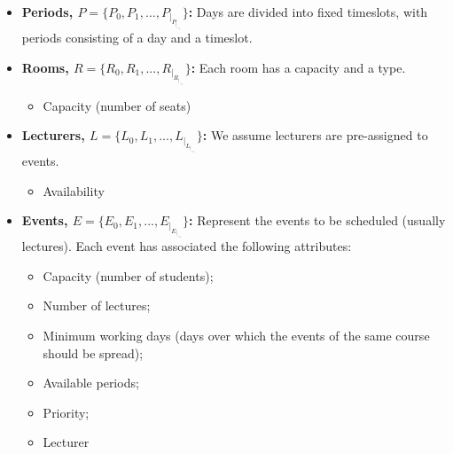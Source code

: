 \begin{itemize}
	\item \textbf{Periods, \(P = \{P_0, P_1, ..., P_|_P_|_-_1\}\):} Days are divided into fixed timeslots, with periods consisting of a day and a timeslot.


	\item \textbf{Rooms, \(R = \{R_0, R_1, ..., R_|_R_|_-_1\}\):} Each room has a capacity and a type.
		\begin{itemize}
			\item Capacity (number of seats)
		\end{itemize}

	\item \textbf{Lecturers, \(L = \{L_0, L_1, ..., L_|_L_|_-_1\}\):} We assume lecturers are pre-assigned to events.
		\begin{itemize}
			\item Availability
		\end{itemize}

	\item \textbf{Events, \(E = \{E_0, E_1, ..., E_|_E_|_-_1\}\):} Represent the events to be scheduled (usually lectures). Each event has associated the following attributes:
		\begin{itemize}
        		\item Capacity (number of students);
        		\item Number of lectures;
        		\item Minimum working days (days over which the events of the same course should be spread);
        		\item Available periods;
        		\item Priority;
        		\item Lecturer
		\end{itemize}


\end{itemize}
